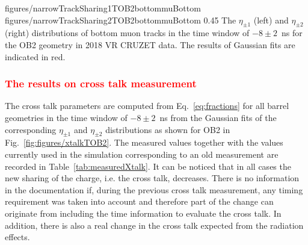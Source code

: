                  {figures/narrowTrackSharing1TOB2bottommuBottom}
                 {figures/narrowTrackSharing2TOB2bottommuBottom} %
                 {0.45}       %
                 { The $\eta_{\pm 1}$ (left) and  $\eta_{\pm 2}$ (right) distributions of bottom muon tracks in the time window of $-8 \pm 2$~ns for the OB2 geometry in 2018 VR CRUZET data. The results of Gaussian fits are indicated in red.}


\subsubsection{\textcolor{red}{The results on cross talk measurement}}

The cross talk parameters are computed from Eq.~\ref{eq:fractions} for all barrel geometries in the time window of $-8 \pm 2$~ns from the Gaussian fits of the corresponding  $\eta_{\pm 1}$ and $\eta_{\pm 2}$ distributions as shown for OB2 in Fig.~\ref{fig:figures/xtalkTOB2}. The measured values together with the values currently used in the simulation corresponding to an old measurement are recorded in Table~\ref{tab:measuredXtalk}. It can be noticed that in all cases the new sharing of the charge, i.e. the cross talk, decreases. There is no information in the documentation if, during the previous cross talk measurement, any timing requirement was taken into account and therefore part of the change can originate from including the time information to evaluate the cross talk. In addition,  there is also a real change in the cross talk expected from the radiation effects. 


